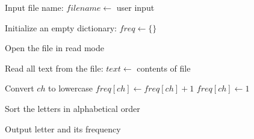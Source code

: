\begin{algorithm}
\caption{Count the Occurrence of Each Letter in a File}
\begin{algorithmic}[1]

\STATE Input file name:
\STATE $filename \gets$ user input

\STATE Initialize an empty dictionary:
\STATE $freq \gets \{\}$

\STATE Open the file in read mode

\STATE Read all text from the file:
\STATE $text \gets$ contents of file

        \STATE Convert $ch$ to lowercase
            \STATE $freq[ch] \gets freq[ch] + 1$
        \ELSE
            \STATE $freq[ch] \gets 1$
        \ENDIF
    \ENDIF
\ENDFOR

\STATE Sort the letters in alphabetical order

    \STATE Output letter and its frequency
\ENDFOR

\end{algorithmic}
\end{algorithm}